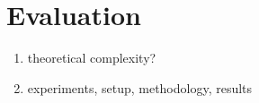 
\chapter{Evaluation}
\label{ch:Evaluation}
\begin{enumerate}
	\item theoretical complexity?
    \item experiments, setup, methodology, results
\end{enumerate}